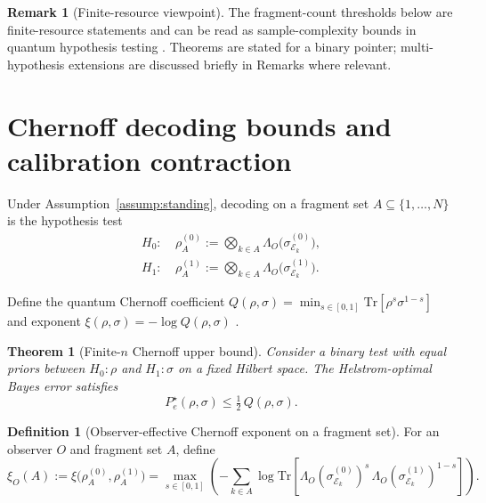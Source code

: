 \documentclass[aps,pra,twocolumn,superscriptaddress,nofootinbib]{revtex4-2}
\newcommand{\cE}{\mathcal{E}}
\newcommand{\1}{\mathbf{1}}
\newcommand{\QCBcoef}{Q}
\newcommand{\QCBdist}{\xi}
\theoremstyle{definition}
\newtheorem{definition}{Definition}
\newtheorem{remark}{Remark}
\theoremstyle{plain}
\newtheorem{theorem}{Theorem}
\begin{document}
\begin{remark}[Finite-resource viewpoint]
The fragment-count thresholds below are finite-resource statements and can be read as sample-complexity bounds in quantum hypothesis testing \cite{Tomamichel2016,AudenaertMosonyiVerstraete2012,ChengDattaLiuNuradhaSalzmannWilde2025}.
Theorems are stated for a binary pointer; multi-hypothesis extensions are discussed briefly in Remarks where relevant.
\end{remark}

\section{Chernoff decoding bounds and calibration contraction}

Under Assumption~\ref{assump:standing}, decoding on a fragment set $A\subseteq\{1,\dots,N\}$ is the hypothesis test
\begin{align}
H_0:&\ \rho_A^{(0)} := \bigotimes_{k\in A} \Lambda_O\bigl(\sigma^{(0)}_{\cE_k}\bigr),
\\
H_1:&\ \rho_A^{(1)} := \bigotimes_{k\in A} \Lambda_O\bigl(\sigma^{(1)}_{\cE_k}\bigr).
\end{align}

Define the quantum Chernoff coefficient
$\QCBcoef(\rho,\sigma)=\min_{s\in[0,1]}\mathrm{Tr}[\rho^s\sigma^{1-s}]$
and exponent $\QCBdist(\rho,\sigma)=-\log \QCBcoef(\rho,\sigma)$ \cite{Audenaert2007,NussbaumSzkola2009}.

\begin{theorem}[Finite-$n$ Chernoff upper bound]
\label{thm:chernoff-upper}
Consider a binary test with equal priors between $H_0:\rho$ and $H_1:\sigma$ on a fixed Hilbert space.
The Helstrom-optimal Bayes error satisfies
\begin{equation}
P_e^\star(\rho,\sigma)\le \tfrac12\,\QCBcoef(\rho,\sigma).
\label{eq:pe-qcb}
\end{equation}
\end{theorem}

\begin{definition}[Observer-effective Chernoff exponent on a fragment set]
For an observer $O$ and fragment set $A$, define
\begin{equation}
\QCBdist_O(A):=\QCBdist\bigl(\rho_A^{(0)},\rho_A^{(1)}\bigr)
=\max_{s\in[0,1]}\left(-\sum_{k\in A}\log \mathrm{Tr}\!\left[\Lambda_O(\sigma^{(0)}_{\cE_k})^s\,\Lambda_O(\sigma^{(1)}_{\cE_k})^{1-s}\right]\right).
\label{eq:xiA}
\end{equation}
\end{definition}
\end{document}
